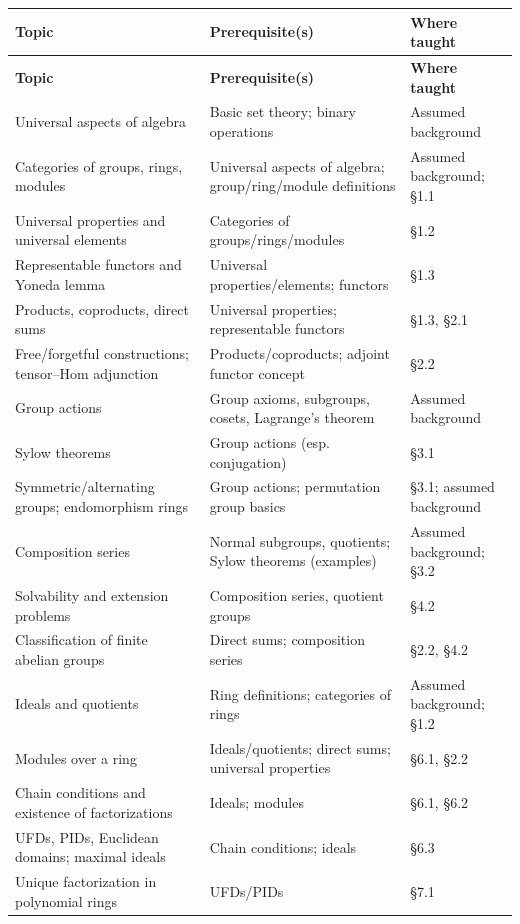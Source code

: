 \documentclass{article}
\begin{document}
\begin{longtable}{p{5cm} p{5cm} p{4.5cm}}
\toprule
\textbf{Topic} & \textbf{Prerequisite(s)} & \textbf{Where taught} \\
\midrule
\endfirsthead
\toprule
\textbf{Topic} & \textbf{Prerequisite(s)} & \textbf{Where taught} \\
\midrule
\endhead
Universal aspects of algebra & Basic set theory; binary operations & Assumed background \\
Categories of groups, rings, modules & Universal aspects of algebra; group/ring/module definitions & Assumed background; \S1.1 \\
Universal properties and universal elements & Categories of groups/rings/modules & \S1.2 \\
Representable functors and Yoneda lemma & Universal properties/elements; functors & \S1.3 \\
Products, coproducts, direct sums & Universal properties; representable functors & \S1.3, \S2.1 \\
Free/forgetful constructions; tensor--Hom adjunction & Products/coproducts; adjoint functor concept & \S2.2 \\
Group actions & Group axioms, subgroups, cosets, Lagrange's theorem & Assumed background \\
Sylow theorems & Group actions (esp. conjugation) & \S3.1 \\
Symmetric/alternating groups; endomorphism rings & Group actions; permutation group basics & \S3.1; assumed background \\
Composition series & Normal subgroups, quotients; Sylow theorems (examples) & Assumed background; \S3.2 \\
Solvability and extension problems & Composition series, quotient groups & \S4.2 \\
Classification of finite abelian groups & Direct sums; composition series & \S2.2, \S4.2 \\
Ideals and quotients & Ring definitions; categories of rings & Assumed background; \S1.2 \\
Modules over a ring & Ideals/quotients; direct sums; universal properties & \S6.1, \S2.2 \\
Chain conditions and existence of factorizations & Ideals; modules & \S6.1, \S6.2 \\
UFDs, PIDs, Euclidean domains; maximal ideals & Chain conditions; ideals & \S6.3 \\
Unique factorization in polynomial rings & UFDs/PIDs & \S7.1 \\

\end{longtable}
\end{document}
